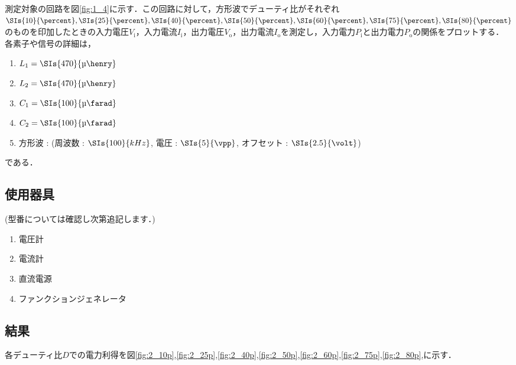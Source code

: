 \documentclass[1_power_supply.tex]{subfiles}
\begin{document}
    測定対象の回路を図\ref{fig:1_4}に示す．この回路に対して，方形波でデューティ比がそれぞれ \\$\SIs{10}{\percent},\SIs{25}{\percent},\SIs{40}{\percent},\SIs{50}{\percent},\SIs{60}{\percent},\SIs{75}{\percent},\SIs{80}{\percent}$のものを印加したときの入力電圧$V_\mathrm{i}$，入力電流$I_\mathrm{i}$，出力電圧$V_\mathrm{o}$，出力電流$I_\mathrm{o}$を測定し，入力電力$P_\mathrm{i}$と出力電力$P_\mathrm{o}$の関係をプロットする．
    各素子や信号の詳細は，
    \begin{enumerate}
      \item $L_1=\SIs{470}{\text{\textmu}\henry}$ %
      \item $L_2=\SIs{470}{\text{\textmu}\henry}$
      \item $C_1=\SIs{100}{\text{\textmu}\farad}$
      \item $C_2=\SIs{100}{\text{\textmu}\farad}$
      \item 方形波 : (周波数 : $\SIs{100}{kHz}$, 電圧 : $\SIs{5}{\vpp}$, オフセット : $\SIs{2.5}{\volt}$)
    \end{enumerate}
    である．

  \subsection{使用器具}

    (型番については確認し次第追記します．)
    \begin{enumerate}
      \item 電圧計
      \item 電流計
      \item 直流電源
      \item ファンクションジェネレータ
    \end{enumerate}

  \subsection{結果}

    各デューティ比$D$での電力利得を図\ref{fig:2_10p},\ref{fig:2_25p},\ref{fig:2_40p},\ref{fig:2_50p},\ref{fig:2_60p},\ref{fig:2_75p},\ref{fig:2_80p},に示す．
\end{document}
